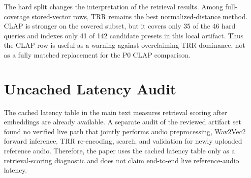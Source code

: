 \documentclass{article}
\begin{document}
\begin{table}[htbp]
	\centering
	\caption{Parameter-cluster hard split at $\tau=0.02$. Rows with zero coverage indicate that the reviewed local dataset does not contain usable cached vectors for that method.}
	\label{tab:supp_hard_split_results}
	\small
\end{table}

The hard split changes the interpretation of the retrieval results. Among full-coverage stored-vector rows, TRR remains the best normalized-distance method. CLAP is stronger on the covered subset, but it covers only 35 of the 46 hard queries and indexes only 41 of 142 candidate presets in this local artifact. Thus the CLAP row is useful as a warning against overclaiming TRR dominance, not as a fully matched replacement for the P0 CLAP comparison.

\section{Uncached Latency Audit}

The cached latency table in the main text measures retrieval scoring after embeddings are already available. A separate audit of the reviewed artifact set found no verified live path that jointly performs audio preprocessing, Wav2Vec2 forward inference, TRR re-encoding, search, and validation for newly uploaded reference audio. Therefore, the paper uses the cached latency table only as a retrieval-scoring diagnostic and does not claim end-to-end live reference-audio latency.
\end{document}
